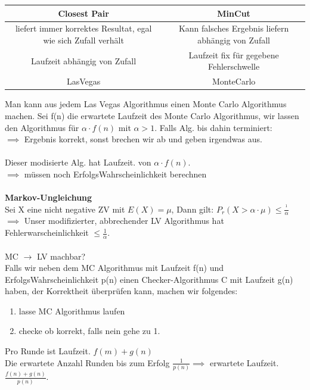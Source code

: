 \documentclass{article}
\begin{document}
\begin{table}[h]
    \centering
\begin{tabular}{c|c}

    Closest Pair & MinCut\\
    \hline
    liefert immer korrektes Resultat, egal wie sich Zufall verhält & Kann falsches Ergebnis liefern abhängig von Zufall\\
    \hline
    Laufzeit abhängig von Zufall & Laufzeit fix für gegebene Fehlerschwelle \\
    \hline
    LasVegas & MonteCarlo
    
\end{tabular}
\end{table}
Man kann aus jedem Las Vegas Algorithmus einen Monte Carlo Algorithmus machen. Sei f(n) die erwartete Laufzeit des Monte Carlo Algorithmus,
wir lassen den Algorithmus für $ \alpha \cdot f(n)$ mit  $\alpha > 1$. Falls Alg. bis dahin terminiert:\\
$\implies$ Ergebnis korrekt, sonst brechen wir ab und geben irgendwas aus.\\
\\
Dieser modisierte Alg. hat Laufzeit. von $\alpha \cdot f(n)$.\\
$\implies$ müssen noch ErfolgsWahrscheinlichkeit berechnen\\
\\
\textbf{Markov-Ungleichung}\\
Sei X eine nicht negative ZV mit $E(X) = \mu$, Dann gilt: $P_r (X> \alpha \cdot \mu) \leq \frac{^1}{\alpha}$\\
$\implies$ Unser modifizierter, abbrechender LV Algorithmus hat Fehlerwarscheinlichkeit $\leq \frac{1}{\alpha}$.\\
\\
MC $\rightarrow$ LV machbar?\\
Falls wir neben dem MC Algorithmus mit Laufzeit f(n) und ErfolgsWahrscheinlichkeit p(n) einen Checker-Algorithmus C mit Laufzeit g(n) haben, der
Korrektheit überprüfen kann, machen wir folgendes:

\begin{enumerate}
    \item lasse MC Algorithmus laufen
    \item checke ob korrekt, falls nein gehe zu 1.
\end{enumerate}

Pro Runde ist Laufzeit. $f(m)+g(n)$\\
Die erwartete Anzahl Runden bis zum Erfolg $\frac{1}{p(n)} \implies$ erwartete Laufzeit. $\frac{f(n)+g(n)}{p(n)}$.
\end{document}
